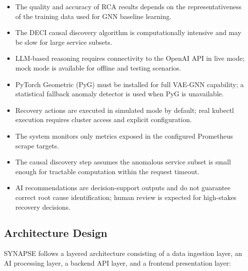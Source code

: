 \documentclass[11pt,a4paper]{article}
\begin{document}
\begin{itemize}
    \item The quality and accuracy of RCA results depends on the representativeness of the training data used for GNN baseline learning.
    \item The DECI causal discovery algorithm is computationally intensive and may be slow for large service subsets.
    \item LLM-based reasoning requires connectivity to the OpenAI API in live mode; mock mode is available for offline and testing scenarios.
    \item PyTorch Geometric (PyG) must be installed for full VAE-GNN capability; a statistical fallback anomaly detector is used when PyG is unavailable.
    \item Recovery actions are executed in simulated mode by default; real kubectl execution requires cluster access and explicit configuration.
    \item The system monitors only metrics exposed in the configured Prometheus scrape targets.
    \item The causal discovery step assumes the anomalous service subset is small enough for tractable computation within the request timeout.
    \item AI recommendations are decision-support outputs and do not guarantee correct root cause identification; human review is expected for high-stakes recovery decisions.
\end{itemize}


\subsection{Architecture Design}

SYNAPSE follows a layered architecture consisting of a data ingestion layer, an AI processing layer, a backend API layer, and a frontend presentation layer:
\end{document}
